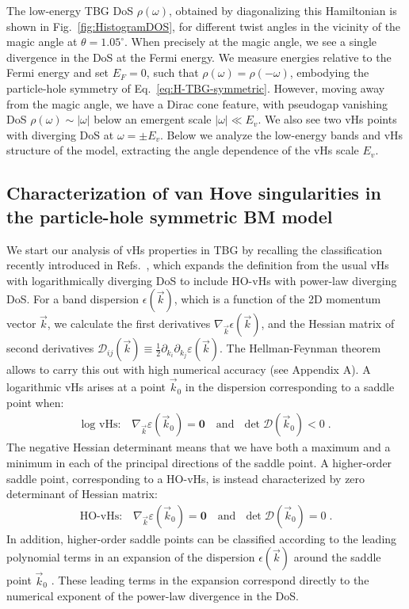 The low-energy TBG DoS $\rho(\omega)$, obtained by diagonalizing this Hamiltonian is shown in Fig.~\ref{fig:HistogramDOS}, for different twist angles in the vicinity of the magic angle at $\theta=1.05^{\circ}$. When precisely at the magic angle, we see a single divergence in the DoS at the Fermi energy. We measure energies relative to the Fermi energy and set $E_F=0$, such that $\rho(\omega)=\rho(-\omega)$, embodying the particle-hole symmetry of Eq.~\eqref{eq:H-TBG-symmetric}. However, moving away from the magic angle, we have a Dirac cone feature, with pseudogap vanishing DoS $\rho(\omega)\sim |\omega|$ below an emergent scale $|\omega|\ll E_v$. We also see two vHs points with diverging DoS at $\omega=\pm E_v$. Below we analyze the low-energy bands and vHs structure of the model, extracting the angle dependence of the vHs scale $E_v$.


\subsection{Characterization of van Hove singularities in the particle-hole symmetric BM model}

We start our analysis of vHs properties in TBG by recalling the classification recently introduced in Refs.~\cite{Yuan2019,Chamon2020PRR,Yuan2020PRB-classification}, which expands the definition from the usual vHs with logarithmically diverging DoS  \cite{vanHove1953} to include HO-vHs with power-law diverging DoS. For a band dispersion $\epsilon(\vec{k})$, which is a function of the 2D momentum vector $\vec{k}$, we calculate the first derivatives $\nabla_{\vec{k}}\epsilon(\vec{k})$, and the Hessian matrix of second derivatives $\mathcal{D}_{i j}(\vec{k}) \equiv \frac{1}{2} \partial_{k_i} \partial_{k_j} \varepsilon(\vec{k})$. The Hellman-Feynman theorem allows to carry this out with high numerical accuracy (see Appendix A). 
A logarithmic vHs arises at a point $\vec{k}_0$ in the dispersion corresponding to a saddle point when:
\begin{align}\label{eq:logvhs}
	\text{log vHs:}\quad \nabla_{\vec{k}}  \varepsilon(\vec{k}_0)=\mathbf{0} \text {~~~and~~} \operatorname{det} \mathcal{D}(\vec{k}_0)<0 \;.
\end{align}
The negative Hessian determinant means that we have both a maximum and a minimum in each of the principal directions of the saddle point. A higher-order saddle point, corresponding to a HO-vHs, is instead characterized by zero determinant of Hessian matrix:
\begin{align}\label{eq:hovhs}
	\text{HO-vHs:}\quad \nabla_{\vec{k}}  \varepsilon(\vec{k}_0)=\mathbf{0} \text {~~~and~~} \operatorname{det} \mathcal{D}(\vec{k}_0)=0 \;.
\end{align}
In addition, higher-order saddle points can be classified according to the leading polynomial terms in an expansion of the dispersion $\epsilon(\vec{k})$ around the saddle point $\vec{k}_0$ \cite{Chamon2020PRR,Yuan2020PRB-classification}. These leading terms in the expansion correspond directly to the numerical exponent of the power-law divergence in the DoS.


